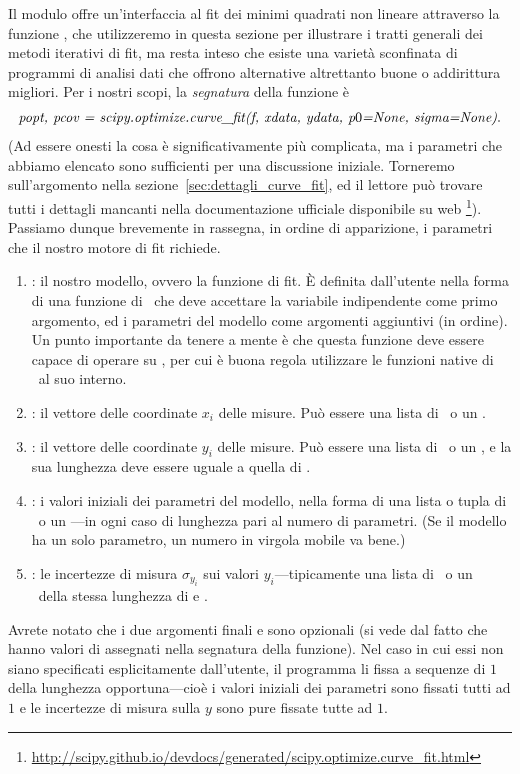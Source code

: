 Il modulo  offre un'interfaccia al fit
dei minimi quadrati non lineare attraverso la funzione ,
che utilizzeremo in questa sezione per illustrare i tratti generali dei
metodi iterativi di fit, ma resta inteso che esiste una varietà
sconfinata di programmi di analisi dati che offrono alternative altrettanto
buone o addirittura migliori. Per i nostri scopi, la \emph{segnatura} della
funzione  è
\begin{align}
  \text{\emph{popt, pcov = scipy.optimize.curve\_fit(f, xdata, ydata, p$0$=None, sigma=None)}.}
\end{align}
(Ad essere onesti la cosa è significativamente più complicata, ma i
parametri che abbiamo elencato sono sufficienti per una discussione iniziale.
Torneremo sull'argomento nella sezione~\ref{sec:dettagli_curve_fit}, ed il
lettore può trovare tutti i dettagli mancanti nella documentazione ufficiale
disponibile su web%
\footnote{\url{http://scipy.github.io/devdocs/generated/scipy.optimize.curve_fit.html}}).
Passiamo dunque brevemente in rassegna, in ordine di
apparizione, i parametri che il nostro motore di fit richiede.
\begin{enumerate}
\item {}: il nostro modello, ovvero la funzione di fit. \`E definita
  dall'utente nella forma di una funzione di \python\ che deve accettare
  la variabile indipendente come primo argomento, ed i parametri del modello
  come argomenti aggiuntivi (in ordine). Un punto importante da tenere a mente
  è che questa funzione deve essere capace di operare su \nparray, per cui è
  buona regola utilizzare le funzioni native di \numpy\ al suo interno.
\item {}: il vettore delle coordinate $x_i$ delle misure.
  Può essere una lista di \python\ o un \nparray.
\item {}: il vettore delle coordinate $y_i$ delle misure.
  Può essere una lista di \python\ o un \nparray, e la
  sua lunghezza deve essere uguale a quella di .
\item {}: i valori iniziali dei parametri del modello, nella forma di
  una lista o tupla di \python\ o un \nparray---in ogni caso di
  lunghezza pari al numero di parametri. (Se il modello ha un solo parametro, un
  numero in virgola mobile va bene.)
\item {}: le incertezze di misura $\sigma_{y_i}$ sui valori
  $y_i$---tipicamente una lista di \python\ o un \nparray\ della
  stessa lunghezza di  e .
\end{enumerate}
Avrete notato che i due argomenti finali  e  sono
opzionali (si vede dal fatto che hanno valori di  assegnati nella
segnatura della funzione). Nel caso in cui essi non siano specificati
esplicitamente dall'utente, il programma li fissa a sequenze di $1$ della
lunghezza opportuna---cioè i valori iniziali dei parametri sono fissati tutti
ad $1$ e le incertezze di misura sulla $y$ sono pure fissate tutte ad $1$.

